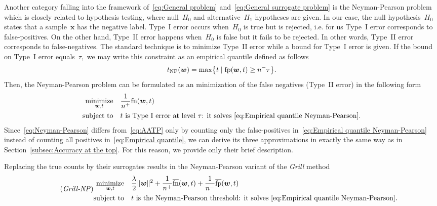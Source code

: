 \documentclass[11pt,a4paper]{article}
\theoremstyle{definition}
\let\originalleft\left
\let\originalright\right
\renewcommand{\left}{\mathopen{}\mathclose\bgroup\originalleft}
\renewcommand{\right}{\aftergroup\egroup\originalright}
\newcommand{\norm}[1]{\|#1\|}
\newcommand{\minimize}{\operatorname*{minimize}}
\newcommand{\st}{\operatorname{subject\ to}}
\newcommand{\fp}{\textnormal{fp}}
\newcommand{\fn}{\textnormal{fn}}
\newcommand{\fps}{\overline{\textnormal{fp}}}
\newcommand{\fns}{\overline{\textnormal{fn}}}
\newcommand{\grill}{\textit{Grill}\xspace}
\newcommand{\grillnp}{\textit{Grill-NP}\xspace}
\begin{document}
Another category falling into the framework of~\eqref{eq:General problem} and~\eqref{eq:General surrogate problem} is the Neyman-Pearson problem~\cite{neyman1933ix} which is closely related to hypothesis testing, where null~$H_0$ and alternative~$H_1$ hypotheses are given. In our case, the null hypothesis~$H_0$ states that a sample~$\bm{x}$ has the negative label. Type~I error occurs when~$H_0$ is true but is rejected, i.e. for us Type~I error corresponds to false-positives. On the other hand, Type~II error happens when~$H_0$ is false but it fails to be rejected. In other words,  Type~II error corresponds to false-negatives. The standard technique is to minimize Type~II error while a bound for Type~I error is given. If the bound on Type~I error equals~$\tau,$ we may write this constraint as an empirical quantile defined as follows
\begin{equation}\label{eq:Empirical quantile Neyman-Pearson} 
  t_{\rm NP}(\bm{w}) = \max\left\{t \mid \fp(\bm{w},t)\ge n^-\tau\right\}.
\end{equation}
Then, the Neyman-Pearson problem can be formulated as an minimization of the false negatives (Type~II error) in the following form
\begin{equation}\label{eq:Neyman-Pearson}
  \begin{aligned}
    \minimize_{\bm{w}, t} & \quad \frac{1}{n^+}\fn(\bm{w},t) \\
    \st                   & \quad t \text{ is Type~I error at level \ensuremath{\tau}: it solves }\eqref{eq:Empirical quantile Neyman-Pearson}.
  \end{aligned}
\end{equation}
Since~\eqref{eq:Neyman-Pearson} differs from~\eqref{eq:AATP} only by counting only the false-positives in~\eqref{eq:Empirical quantile Neyman-Pearson} instead of counting all positives in~\eqref{eq:Empirical quantile}, we can derive its three approximations in exactly the same way as in Section~\ref{subsec:Accuracy at the top}. For this reason, we provide only their brief description.

Replacing the true counts by their surrogates results in the Neyman-Pearson variant of the \grill method
\begin{equation}\label{eq:Grill Neyman-Pearson}\tag{\grillnp}
  \begin{aligned}
    \minimize_{\bm{w}, t} & \quad \frac{\lambda}{2}\norm{\bm{w}}^2 + \frac{1}{n^+}\fns(\bm{w},t) + \frac{1}{n^-}\fps(\bm{w},t)\\
    \st                   & \quad t \text{ is the Neyman-Pearson threshold: it solves }\eqref{eq:Empirical quantile Neyman-Pearson}.
  \end{aligned}
\end{equation}
\end{document}

